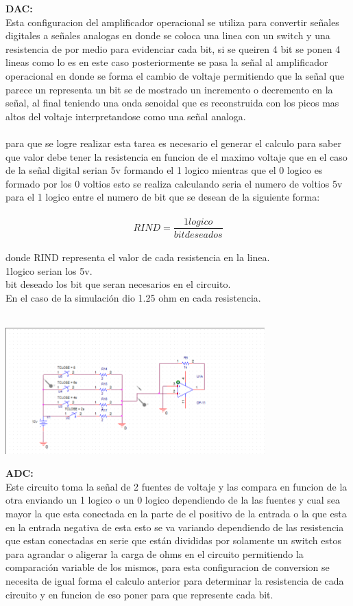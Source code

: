\documentclass[12pt,a4paper]{article}
\begin{document}
\textbf{DAC:\\}
Esta configuracion del amplificador operacional se utiliza para convertir señales digitales a señales analogas en donde se coloca una linea con un switch y una resistencia de por medio para evidenciar cada bit, si se queiren 4 bit se ponen 4 lineas como lo es en este caso posteriormente se pasa la señal al amplificador operacional en donde se forma el cambio de voltaje permitiendo que la señal que parece un representa un bit se de mostrado un incremento o decremento en la señal, al final teniendo una onda senoidal que es reconstruida con los picos mas altos del voltaje interpretandose como una señal analoga.\\\\
para que  se logre realizar esta tarea es necesario el generar el calculo para saber que valor debe tener la resistencia en funcion de el maximo voltaje que en el caso de la señal digital serian 5v formando el 1 logico mientras que el 0 logico es formado por los 0 voltios esto se realiza calculando seria el numero de voltios 5v para el 1 logico entre el numero de bit que se desean de la siguiente forma:\\\\
$$RIND=\frac{1logico}{bit deseados}$$\\
donde RIND representa el valor de cada resistencia en la linea.\\
1logico serian los 5v.\\
bit deseado los bit que seran necesarios en el circuito.\\
En el caso de la simulación dio 1.25 ohm en cada resistencia.\\\\

\begin{center}
\includegraphics[width=10cm]{Simulaciones/DAC.png} 
\end{center}

\textbf{ADC:\\}
Este circuito toma la señal de 2 fuentes de voltaje y las compara en funcion de la otra enviando un 1 logico o un 0 logico dependiendo de la las fuentes y cual sea mayor la que esta conectada en la parte de el positivo de la entrada o la que esta en la entrada negativa de esta esto se va variando dependiendo de las resistencia que estan conectadas en serie que están divididas por solamente un switch estos para agrandar o aligerar la carga de ohms en el circuito permitiendo la comparación variable de los mismos, para esta configuracion de conversion se necesita de igual forma el calculo anterior para determinar la resistencia de cada circuito y en funcion de eso poner para que represente cada bit.\\
\end{document}
